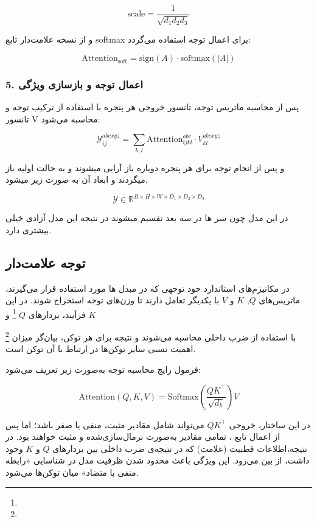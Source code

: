 \[
\text{scale} = \frac{1}{\sqrt{d_1 d_2 d_3}}
\]

و از نسخه علامت‌دار تابع softmax برای اعمال توجه استفاده می‌گردد:

\[
\text{Attention}_{\text{soft}} = \text{sign}(A) \cdot \text{softmax}(|A|)
\]

\subsubsection*{5. اعمال توجه و بازسازی ویژگی}

پس از محاسبه ماتریس توجه، تانسور خروجی هر پنجره با استفاده از ترکیب توجه و تانسور V محاسبه می‌شود:

\[
\mathcal{Y}_{ij}^{abcxyz} = \sum_{k,l} \text{Attention}_{ijkl}^{abc} \cdot V_{kl}^{abcxyz}
\]

و پس از انجام توجه برای هر پنجره دوباره باز آرایی میشوند و به حالت اولیه باز میگردند و ابعاد آن به صورت زیر میشود.

\[
\mathcal{Y} \in \mathbb{R}^{B \times H \times W \times D_1 \times D_2 \times D_3}
\]

در این مدل چون سر ها در سه بعد تفسیم میشوند در نتیجه این مدل آزادی خیلی بیشتری دارد.






\subsection{توجه علامت‌دار}

در مکانیزم‌های استاندارد خود توجهی که در مبدل ها مورد استفاده قرار می‌گیرند، ماتریس‌های $Q$, $K$ و $V$ با یکدیگر تعامل دارند تا وزن‌های توجه استخراج شوند. در این فرآیند، بردارهای $Q$  \footnote{}
 و $K$ 
 
 \footnote{}
  با استفاده از ضرب داخلی محاسبه می‌شوند و نتیجه برای هر توکن، بیان‌گر میزان اهمیت نسبی سایر توکن‌ها در ارتباط با آن توکن است.

فرمول رایج محاسبه توجه به‌صورت زیر تعریف می‌شود:

\[
\text{Attention}(Q, K, V) = \text{Softmax}\left( \frac{QK^\top}{\sqrt{d_k}} \right) V
\]

در این ساختار، خروجی $QK^\top$ می‌تواند شامل مقادیر مثبت، منفی یا صفر باشد؛ اما پس از اعمال تابع ، تمامی مقادیر به‌صورت نرمال‌سازی‌شده و مثبت خواهند بود. در نتیجه،اطلاعات قطبیت (علامت) که در نتیجه‌ی ضرب داخلی بین بردارهای $Q$ و $K$ وجود داشت، از بین می‌رود. این ویژگی باعث محدود شدن ظرفیت مدل در شناسایی «رابطه منفی یا متضاد» میان توکن‌ها می‌شود.

